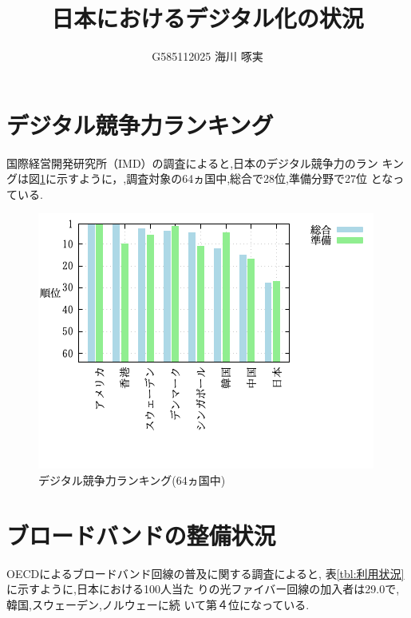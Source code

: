 \documentclass[a4paper,11pt,dvipdfmx]{ujarticle}
\title{日本におけるデジタル化の状況}
\author{G585112025 海川 啄実}
\begin{document}
\maketitle %

\section{デジタル競争力ランキング}
    国際経営開発研究所（IMD）の調査\cite{imd}によると,日本のデジタル競争力のラン
キングは図\ref{fig:デジタル}に示すように，,調査対象の64ヵ国中,総合で28位,準備分野で27位
となっている.

\begin{figure}[htbt]
    \centering
    \includegraphics{表１.png}
    \caption{デジタル競争力ランキング(64ヵ国中)}\label{fig:デジタル}
\end{figure}

\newpage

\section{ブロードバンドの整備状況}

OECDによるブロードバンド回線の普及に関する調査\cite{oecd}によると,
表\ref{tbl:利用状況}に示すように,日本における100人当た
りの光ファイバー回線の加入者は29.0で,韓国,スウェーデン,ノルウェーに続
いて第４位になっている.
\end{document}
